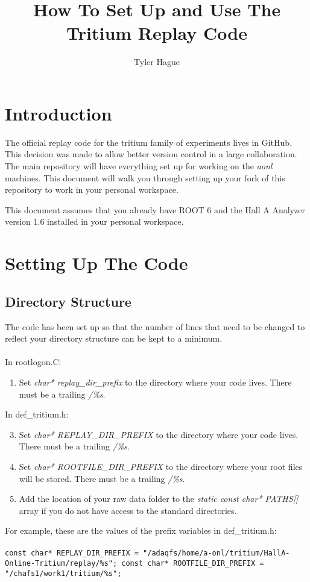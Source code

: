 \documentclass{report}
\begin{document}
\title{How To Set Up and Use The Tritium Replay Code}
\author{Tyler Hague}
\maketitle

\chapter{Introduction}
The official replay code for the tritium family of experiments lives in GitHub. This decision was made to allow better version control in a large collaboration. The main repository will have everything set up for working on the \textit{aonl} machines. This document will walk you through setting up your fork of this repository to work in your personal workspace.

This document assumes that you already have ROOT 6 and the Hall A Analyzer version 1.6 installed in your personal workspace.

\chapter{Setting Up The Code}

\section{Directory Structure}
The code has been set up so that the number of lines that need to be changed to reflect your directory structure can be kept to a minimum.
\\\\
\noindent In rootlogon.C:
\begin{enumerate}
\item Set \textit{char* replay\_dir\_prefix} to the directory where your code lives. There must be a trailing \textit{/\%s}.
\end{enumerate}
In def\_tritium.h:
\begin{enumerate}
\setcounter{enumi}{2}
\item Set \textit{char* REPLAY\_DIR\_PREFIX} to the directory where your code lives. There must be a trailing \textit{/\%s}.
\item Set \textit{char* ROOTFILE\_DIR\_PREFIX} to the directory where your root files will be stored. There must be a trailing \textit{/\%s}.
\item Add the location of your raw data folder to the \textit{static const char* PATHS[]} array if you do not have access to the standard directories.
\end{enumerate}

For example, these are the values of the prefix variables in def\_tritium.h:
\\\\\noindent\texttt{const char* REPLAY\_DIR\_PREFIX = "/adaqfs/home/a-onl/tritium/HallA-Online-Tritium/replay/\%s";
const char* ROOTFILE\_DIR\_PREFIX = "/chafs1/work1/tritium/\%s";}
\end{document}

